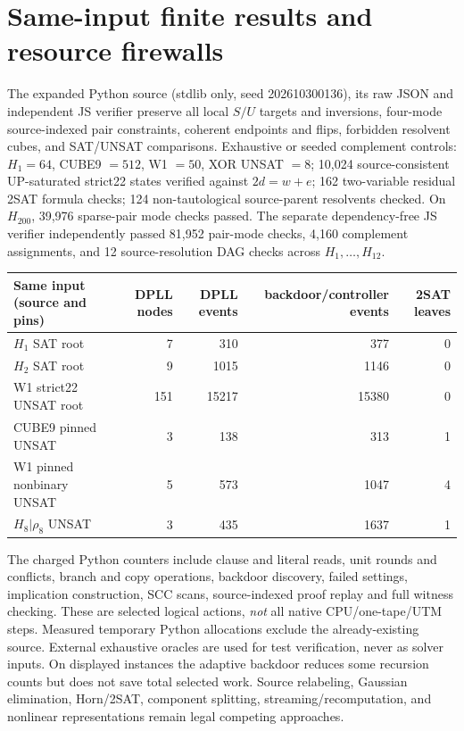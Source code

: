 \documentclass[10pt]{article}
\begin{document}
\section*{Same-input finite results and resource firewalls}
The expanded Python source (stdlib only, seed 202610300136), its raw JSON and independent JS verifier preserve all local $S/U$ targets and inversions, four-mode source-indexed pair constraints, coherent endpoints and flips, forbidden resolvent cubes, and SAT/UNSAT comparisons. Exhaustive or seeded complement controls: $H_1=64$, CUBE9 $=512$, W1 $=50$, XOR UNSAT $=8$; 10,024 source-consistent UP-saturated strict22 states verified against $2d=w+e$; 162 two-variable residual 2SAT formula checks; 124 non-tautological source-parent resolvents checked. On $H_{200}$, 39,976 sparse-pair mode checks passed. The separate dependency-free JS verifier independently passed 81,952 pair-mode checks, 4,160 complement assignments, and 12 source-resolution DAG checks across $H_1,\ldots,H_{12}$.
\begin{center}\small
\begin{tabular}{lrrrr}
\toprule
Same input (source and pins)&DPLL nodes&DPLL events&backdoor/controller events&2SAT leaves\\
\midrule
$H_1$ SAT root&7&310&377&0\\
$H_2$ SAT root&9&1015&1146&0\\
W1 strict22 UNSAT root&151&15217&15380&0\\
CUBE9 pinned UNSAT&3&138&313&1\\
W1 pinned nonbinary UNSAT&5&573&1047&4\\
$H_8|\rho_8$ UNSAT&3&435&1637&1\\
\bottomrule
\end{tabular}
\end{center}
The charged Python counters include clause and literal reads, unit rounds and conflicts, branch and copy operations, backdoor discovery, failed settings, implication construction, SCC scans, source-indexed proof replay and full witness checking. These are selected logical actions, \emph{not} all native CPU/one-tape/UTM steps. Measured temporary Python allocations exclude the already-existing source. External exhaustive oracles are used for test verification, never as solver inputs. On displayed instances the adaptive backdoor reduces some recursion counts but does not save total selected work. Source relabeling, Gaussian elimination, Horn/2SAT, component splitting, streaming/recomputation, and nonlinear representations remain legal competing approaches.
\end{document}
